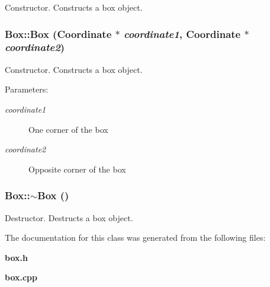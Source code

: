 Constructor. Constructs a box object. 
\subsubsection{\setlength{\rightskip}{0pt plus 5cm}Box::Box ({\bf Coordinate} $\ast$ {\em coordinate1}, {\bf Coordinate} $\ast$ {\em coordinate2})}\label{classBox_a1}


Constructor. Constructs a box object. \begin{Desc}
\item[Parameters: ]\par
\begin{description}
\item[{\em 
coordinate1}]One corner of the box \item[{\em 
coordinate2}]Opposite corner of the box \end{description}
\end{Desc}
\subsubsection{\setlength{\rightskip}{0pt plus 5cm}Box::$\sim$Box ()}\label{classBox_a2}


Destructor. Destructs a box object. 

The documentation for this class was generated from the following files:\begin{CompactItemize}
\item 
{\bf box.h}\item 
{\bf box.cpp}\end{CompactItemize}
